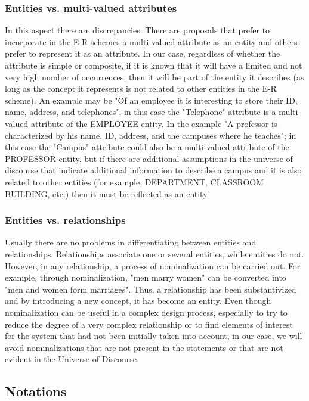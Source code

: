\documentclass{article}
\begin{document}
\subsubsection{Entities vs. multi-valued attributes}

In this aspect there are discrepancies.  There are proposals that prefer to incorporate in the E-R schemes a multi-valued attribute as an entity and others prefer to represent it as an attribute.  In our case, regardless of whether the attribute is simple or composite, if it is known that it will have a limited and not very high number of occurrences, then it will be part of the entity it describes (as long as the concept it represents is not related to other entities in the E-R scheme).  An example may be "Of an employee it is interesting to store their ID, name, address, and telephones"; in this case the "Telephone" attribute is a multi-valued attribute of the EMPLOYEE entity.  In the example "A professor is characterized by his name, ID, address, and the campuses where he teaches"; in this case the "Campus" attribute could also be a multi-valued attribute of the PROFESSOR entity, but if there are additional assumptions in the universe of discourse that indicate additional information to describe a campus and it is also related to other entities (for example, DEPARTMENT, CLASSROOM BUILDING, etc.) then it must be reflected as an entity.

\subsubsection{Entities vs. relationships}

Usually there are no problems in differentiating between entities and relationships.  Relationships associate one or several entities, while entities do not.  However, in any relationship, a process of nominalization can be carried out.  For example, through nominalization, "men marry women" can be converted into "men and women form marriages".  Thus, a relationship has been substantivized and by introducing a new concept, it has become an entity.  Even though nominalization can be useful in a complex design process, especially to try to reduce the degree of a very complex relationship or to find elements of interest for the system that had not been initially taken into account, in our case, we will avoid nominalizations that are not present in the statements or that are not evident in the Universe of Discourse.

\subsection{Notations}
\end{document}

